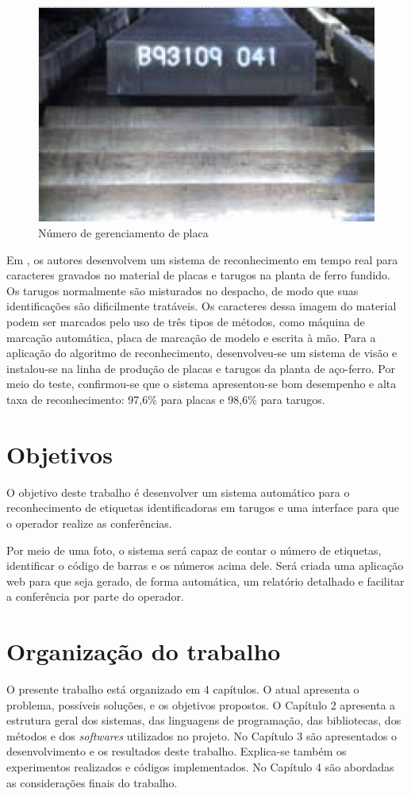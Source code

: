 \begin{figure}[htbp]
	\centering
	\includegraphics[width=0.5\linewidth]{figuras/Steel/SMN.png}
	\caption{Número de gerenciamento de placa}
	\label{fig:SMN}
\end{figure}


Em , os autores desenvolvem um sistema de reconhecimento em tempo real para caracteres gravados no material de placas e tarugos na planta de ferro fundido. 
%
Os tarugos normalmente são misturados no despacho, de modo que suas identificações são dificilmente tratáveis. Os caracteres dessa imagem do material podem ser marcados pelo uso de três tipos de métodos, como máquina de marcação automática, placa de marcação de modelo e escrita à mão. Para a aplicação do algoritmo de reconhecimento, desenvolveu-se um sistema de visão e instalou-se na linha de produção de placas e tarugos da planta de aço-ferro. Por meio do teste, confirmou-se que o sistema apresentou-se bom desempenho e alta taxa de reconhecimento: 97,6\% para placas e 98,6\% para tarugos.

\section{Objetivos} 

O objetivo deste trabalho é desenvolver um sistema automático para o reconhecimento de etiquetas identificadoras em tarugos e uma interface para que o operador realize as conferências. 

Por meio de uma foto, o sistema será capaz de contar o número de etiquetas, identificar o código de barras e os números acima dele. Será criada uma aplicação web para que seja gerado, de forma automática, um relatório detalhado e facilitar a conferência por parte do operador.

\section{Organização do trabalho}

O presente trabalho está organizado em 4 capítulos. O atual apresenta o problema, possíveis soluções, e os objetivos propostos.
%
O Capítulo 2 apresenta a estrutura geral dos sistemas, das linguagens de programação, das bibliotecas, dos métodos e dos \textit{softwares} utilizados no projeto.
%
No Capítulo 3 são apresentados o desenvolvimento e os resultados deste trabalho. Explica-se também os experimentos realizados e códigos implementados.
%
No Capítulo 4 são abordadas as considerações finais do trabalho.